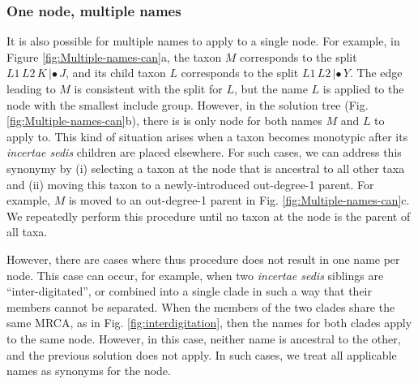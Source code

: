 \documentclass[english]{article}
\begin{document}
\subsubsection{One node, multiple names}
It is also possible for multiple names to apply to a single node. For example,
in Figure \ref{fig:Multiple-names-can}a, the taxon $M$ corresponds to the split
$L1\,L2\,K\,|\bullet\,J$, and its child taxon $L$ corresponds to the split $L1\,L2\,|\bullet\,Y$.
The edge leading to $M$ is consistent with the split for $L$, but the name $L$ is
applied to the node with the smallest include group.
However, in the
solution tree (Fig. \ref{fig:Multiple-names-can}b), there is is only node for
both names $M$ and $L$ to apply to.
This kind of situation arises when a taxon
becomes monotypic after its \emph{incertae sedis} children are placed elsewhere.
For such cases, we can address this synonymy by (i) selecting a taxon at the
node that is ancestral to all other taxa and (ii) moving this taxon to a
newly-introduced out-degree-1 parent.  For example, $M$ is moved to an
out-degree-1 parent in Fig. \ref{fig:Multiple-names-can}c.
We repeatedly perform
this procedure until no taxon at the node is the parent of all taxa.


However, there are cases where thus procedure does not result in one name per
node.  This case can occur, for example, when two \emph{incertae sedis} siblings are 
``inter-digitated'', or  combined into a single clade in such a way that their
members cannot be separated.  When the members of the two clades share the same
MRCA, as in Fig. \ref{fig:interdigitation}, then the names for both clades
apply to the same node.  However, in this case, neither name is ancestral to
the other, and the previous solution does not apply.
In such cases, we treat all applicable names as synonyms for the node.
\end{document}
